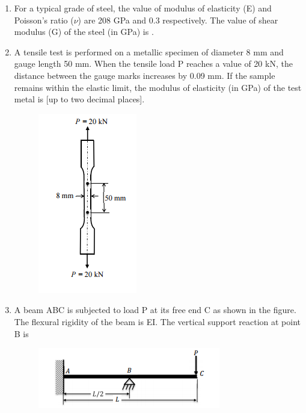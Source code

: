 \documentclass[a4paper,10pt]{article}
\begin{document}
\begin{enumerate}
    \item For a typical grade of steel, the value of modulus of elasticity (E) and Poisson's ratio ($\nu$) are 208 GPa and 0.3 respectively. The value of shear modulus (G) of the steel (in GPa) is \underline{\hspace{2cm}}.
    \hfill{}

    \item A tensile test is performed on a metallic specimen of diameter 8 mm and gauge length 50 mm. When the tensile load P reaches a value of 20 kN, the distance between the gauge marks increases by 0.09 mm. If the sample remains within the elastic limit, the modulus of elasticity (in GPa) of the test metal is \underline{\hspace{2cm}} [up to two decimal places].
    \begin{figure}[H] \centering \includegraphics[width=0.3\columnwidth]{q9_solid.png} \caption*{} \label{fig:q9_solid} \end{figure}
    \hfill{}

    \item A beam ABC is subjected to load P at its free end C as shown in the figure. The flexural rigidity of the beam is EI. The vertical support reaction at point B is
    \begin{figure}[H] \centering \includegraphics[width=0.6\columnwidth]{q10_solid.png} \caption*{} \label{fig:q10_solid} \end{figure}
    \hfill{}
    \begin{enumerate}[label=\Alph*)]
    \end{enumerate}


\end{enumerate}
\end{document}
